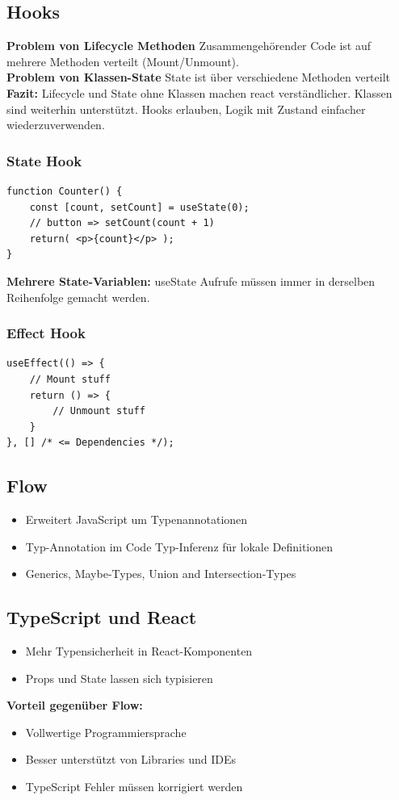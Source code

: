 \subsection{Hooks}
\textbf{Problem von Lifecycle Methoden}
Zusammengehörender Code ist auf mehrere Methoden verteilt (Mount/Unmount).\\
\textbf{Problem von Klassen-State}
State ist über verschiedene Methoden verteilt\\
\textbf{Fazit:} Lifecycle und State ohne Klassen machen react verständlicher.
Klassen sind weiterhin unterstützt.
Hooks erlauben, Logik mit Zustand einfacher wiederzuverwenden.

\subsubsection{State Hook}
\begin{lstlisting}
function Counter() {
    const [count, setCount] = useState(0);
    // button => setCount(count + 1)
    return( <p>{count}</p> );
}
\end{lstlisting}
\textbf{Mehrere State-Variablen:} useState Aufrufe müssen immer in derselben Reihenfolge gemacht werden.

\subsubsection{Effect Hook}
\begin{lstlisting}
useEffect(() => {
    // Mount stuff
    return () => {
        // Unmount stuff
    }
}, [] /* <= Dependencies */);
\end{lstlisting}

\subsection{Flow}
\begin{itemize}
    \item Erweitert JavaScript um Typenannotationen
    \item Typ-Annotation im Code Typ-Inferenz für lokale Definitionen
    \item Generics, Maybe-Types, Union and Intersection-Types
\end{itemize}

\subsection{TypeScript und React}
\begin{itemize}
    \item Mehr Typensicherheit in React-Komponenten
    \item Props und State lassen sich typisieren
\end{itemize}
\textbf{Vorteil gegenüber Flow:}
\begin{itemize}
    \item Vollwertige Programmiersprache
    \item Besser unterstützt von Libraries und IDEs
    \item TypeScript Fehler müssen korrigiert werden
\end{itemize}

